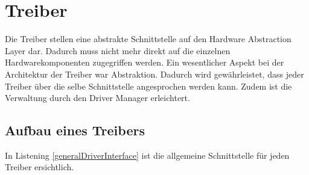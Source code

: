 \section{Treiber}
Die Treiber stellen eine abstrakte Schnittstelle auf den Hardware Abstraction Layer dar. Dadurch muss nicht mehr direkt auf die einzelnen Hardwarekomponenten zugegriffen werden. Ein wesentlicher Aspekt bei der Architektur der Treiber war Abstraktion. Dadurch wird gewährleistet, dass jeder Treiber über die selbe Schnittstelle angesprochen werden kann. Zudem ist die Verwaltung durch den Driver Manager erleichtert.

\subsection{Aufbau eines Treibers}
In Listening \ref{generalDriverInterface} ist die allgemeine Schnittstelle für jeden Treiber ersichtlich.



\pagebreak 
